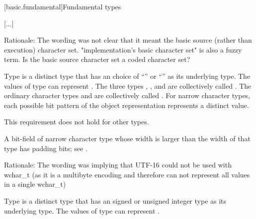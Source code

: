 \documentclass{wg21}
\begin{document}
[basic.fundamental]{Fundamental types}

[...]


\begin{quoteblock}
Rationale: The wording was not clear that it meant the basic source (rather than execution) character set.
"implementation's basic character set" is also a fuzzy term. Is the basic source character set a coded character set?
\end{quoteblock}


%
%
%
%
%
%
%
%
Type  is a distinct type
that has an  choice of
``'' or ``'' as its underlying type.
The values of type  can represent .
The three types , , and 
are collectively called
.
The ordinary character types and 
are collectively called .
For narrow character types,
each possible bit pattern of the object representation represents
a distinct value.
\begin{note}
 This requirement does not hold for other types.
\end{note}
\begin{note}
 A bit-field of narrow character type whose width is larger than the width of that type has padding bits; see .
\end{note}

\begin{quoteblock}
Rationale: The wording was implying that UTF-16 could not be used with wchar_t (as it is a multibyte encoding and therefore can not represent all values in a single wchar_t)
\end{quoteblock}


%
%
%
Type  is a distinct type that has
an 
signed or unsigned integer type as its underlying type.
The values of type  can represent
.
\end{document}

